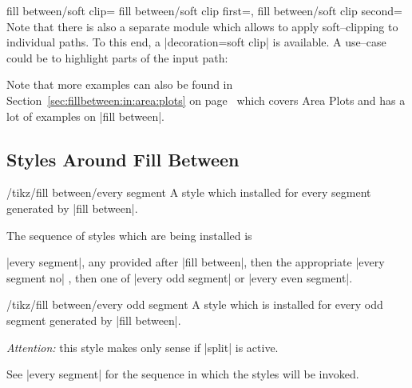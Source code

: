 \begin{tikzkeylist}{%
	fill between/soft clip=
	fill between/soft clip first=,
	fill between/soft clip second=%
}
	Note that there is also a separate module which allows to apply soft--clipping to individual paths. To this end, a |decoration=soft clip| is available. A use--case could be to highlight parts of the input path:
\begin{codeexample}[]
\end{codeexample}


	Note that more examples can also be found in Section~\ref{sec:fillbetween:in:area:plots} on page~\pageref{sec:fillbetween:in:area:plots} which covers Area Plots and has a lot of examples on |fill between|.
\end{tikzkeylist}

\subsection{Styles Around Fill Between}

\begin{stylekey}{/tikz/fill between/every segment}
	A style which installed for every segment generated by |fill between|.

	The sequence of styles which are being installed is 

	|every segment|, any  provided after | fill between|, then the appropriate |every segment no| , then one of |every odd segment| or |every even segment|.
\end{stylekey}

\begin{stylekey}{/tikz/fill between/every odd segment}
	A style which is installed for every odd segment generated by |fill between|.

	\emph{Attention:} this style makes only sense if |split| is active.

	See |every segment| for the sequence in which the styles will be invoked.
\end{stylekey}

